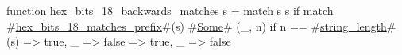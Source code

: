 function hex_bits_18_backwards_matches s = match s {
  s if match #\hyperref[sailRISCVzhexzybitszy18zymatcheszyprefix]{hex\_bits\_18\_matches\_prefix}#(s) {
    #\hyperref[sailRISCVzSome]{Some}# (_, n) if n == #\hyperref[sailRISCVzstringzylength]{string\_length}#(s) => true,
    _ => false
  } => true,
  _ => false
}
